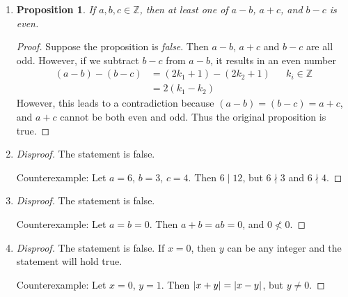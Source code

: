 \documentclass{homework}
\newtheorem*{prop}{Proposition}
\begin{document}
\begin{enumerate}
\begin{proof}[Disproof]
			Counterexample: Suppose $A = \{1\}$, $B = \{1\}$. Then $A \cup B = \{1\}$ and $\abs{ A \cup B } = 1$. However, $\abs{A} + \abs{B} = 2$. And $1 \ne 2$.
		\end{proof} 
	
		\item \begin{minipage}[t]{\linewidth}
			\begin{prop}
				If $a, b, c \in \mathbb{Z}$, then at least one of $a-b$, $a+c$, and $b-c$ is even.
			\end{prop}
			\begin{proof}
				Suppose the proposition is \textit{false}. Then $a-b$, $a+c$ and $b-c$ are all odd. However, if we subtract $b-c$ from $a-b$, it results in an even number \begin{align*}
					\left(a-b\right) - \left(b - c\right) & = \left(2k_1 + 1\right) - \left(2k_2 + 1\right) && k_i \in \mathbb{Z} \\
						& = 2\left(k_1 - k_2\right)
				\end{align*}
				However, this leads to a contradiction because $\left( a-b \right) = \left(b - c\right) = a+c$, and $a+c$ cannot be both even and odd. Thus the original proposition is true.
			\end{proof}
		\end{minipage}
	
		\item \begin{proof}[Disproof]
			The statement is false. 

			Counterexample:	Let $a=6$, $b=3$, $c=4$. Then $6 \mid 12$, but $6 \nmid 3$ and $6\nmid 4$.
		\end{proof}
	
		\item \begin{proof}[Disproof]
			The statement is false.
			
			Counterexample: Let $a = b = 0$. Then $a + b = ab = 0$, and $0 \nless 0$.
		\end{proof}
	
		\item \begin{proof}[Disproof]
			The statement is false. If $x=0$, then $y$ can be any integer and the statement will hold true.
			
			Counterexample: Let $x = 0$, $y=1$. Then $\abs{x + y} = \abs{x - y}$, but $y \ne 0$.
		\end{proof}
	\end{enumerate}
\end{document}
